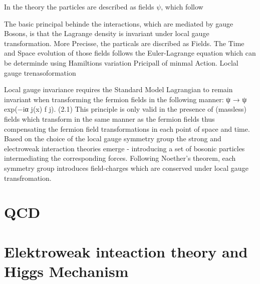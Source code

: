 In the theory the particles are described as fields $\psi$, which follow 

\noindent The basic principal behinde the interactions, which are mediated by gauge Bosons, is  that the Lagrange density is invariant under local gauge transformation. More Precisse, the particals are discribed as Fields. The Time and Space evolution of those fields follows the Euler-Lagrange equation which can be determinde using Hamiltions variation Pricipall of minmal Action. 
Loclal gauge trenasoformation



Local gauge invariance requires the Standard Model Lagrangian to remain invariant when transforming the fermion fields in the following manner:
ψ → ψ exp(−iα j(x) f j). (2.1)
This principle is only valid in the presence of (massless) fields which transform in the same manner as the fermion fields thus compensating the fermion field transformations in each point of space and time. Based on the choice of the local gauge symmetry group the strong and electroweak interaction theories emerge - introducing a set of bosonic particles intermediating the corresponding forces. Following Noether’s theorem, each symmetry group introduces field-charges which are conserved under local gauge transfromation.





\clearpage

\clearpage


\section{QCD}


\clearpage
\section{Elektroweak inteaction theory and Higgs Mechanism}


\clearpage